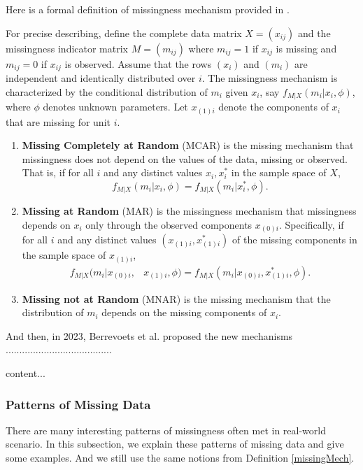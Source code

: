 Here is a formal definition of missingness mechanism provided in \cite{...}.
\begin{defi}\label{missingMech}
	For precise describing, define the complete data matrix $ X=(x_{ij}) $ and the missingness indicator matrix $ M=(m_{ij}) $ where $ m_{ij}=1 $ if $ x_{ij} $ is missing and $ m_{ij}=0 $ if $ x_{ij} $ is observed.
	Assume that the rows $ (x_i) $ and $ (m_i) $ are independent and identically distributed over $ i $.
	The missingness mechanism is characterized by the conditional distribution of $ m_i $ given $ x_i $, say $ f_{M|X}(m_i|x_i,\phi) $, where $ \phi $ denotes unknown parameters.
	Let $ x_{(1)i} $ denote the components of $ x_i $ that are missing for unit $ i $.
	\begin{enumerate}
		\item \textbf{Missing Completely at Random} (MCAR) is the missing mechanism that missingness does not depend on the values of the data, missing or observed.
		That is, if for all $ i $ and any distinct values $ x_i,x_i^* $ in the sample space of $ X $, $$ f_{M|X}(m_i|x_i,\phi)=f_{M|X}(m_i|x_i^*,\phi). $$
		\item \textbf{Missing at Random} (MAR) is the missingness mechanism that missingness depends on $ x_i $ only through the observed components $ x_{(0)i} $.
		Specifically, if for all $ i $ and any distinct values $ (x_{(1)i},x_{(1)i}^*) $ of the missing components in the sample space of $ x_{(1)i} $,
		\begin{align*}
			f_{M|X}(m_i|x_{(0)i},&x_{(1)i},\phi)
			=f_{M|X}(m_i|x_{(0)i},x_{(1)i}^*,\phi).
		\end{align*} 
		\item \textbf{Missing not at Random} (MNAR) is the missing mechanism that the distribution of $ m_i $ depends on the missing components of $ x_i $.
	\end{enumerate}
\end{defi}

And then, in 2023, Berrevoets et al. \cite{MCM} proposed the new mechanisms .......................................
\begin{defi}
	content...
\end{defi}

\subsubsection{Patterns of Missing Data}\label{pattern}
There are many interesting patterns of missingness often met in real-world scenario.
In this subsection, we explain these patterns of missing data and give some examples.
And we still use the same notions from Definition \ref{missingMech}.

